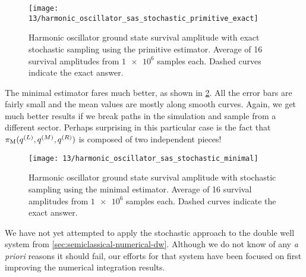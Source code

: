 \begin{figure}
	\centering
	\texttt{[image: 13/harmonic\_oscillator\_sas\_stochastic\_primitive\_exact]}
	\caption[
		Harmonic oscillator survival amplitude using primitive estimator (exact sampling)
	]{
		Harmonic oscillator ground state survival amplitude with exact stochastic sampling using the primitive estimator.
		Average of 16 survival amplitudes from $\num{1e6}$ samples each.
		Dashed curves indicate the exact answer.
	}
	\label{fig:harmonic-oscillator-survival-primitive-exact}
\end{figure}

The minimal estimator fares much better, as shown in \cref{fig:harmonic-oscillator-survival-minimal}.
All the error bars are fairly small and the mean values are mostly along smooth curves.
Again, we get much better results if we break paths in the simulation and sample from a different sector.
Perhaps surprising in this particular case is the fact that $\pi_\mathrm{M}(q^{(L)}, q^{(M)}, q^{(R)})$ is composed of two independent pieces!

\begin{figure}
	\centering
	\texttt{[image: 13/harmonic\_oscillator\_sas\_stochastic\_minimal]}
	\caption[
		Harmonic oscillator survival amplitude using minimal estimator
	]{
		Harmonic oscillator ground state survival amplitude with stochastic sampling using the minimal estimator.
		Average of 16 survival amplitudes from $\num{1e6}$ samples each.
		Dashed curves indicate the exact answer.
	}
	\label{fig:harmonic-oscillator-survival-minimal}
\end{figure}

We have not yet attempted to apply the stochastic approach to the double well system from \cref{sec:semiclassical-numerical-dw}.
Although we do not know of any \textit{a priori} reasons it should fail, our efforts for that system have been focused on first improving the numerical integration results.
